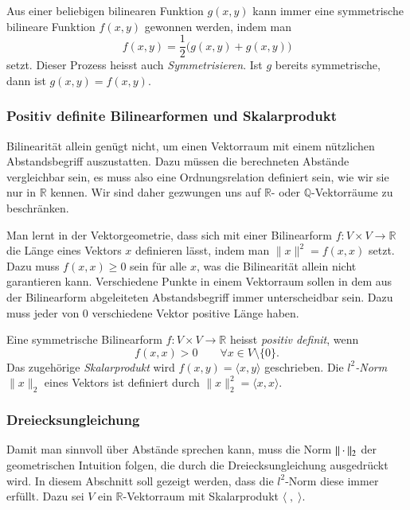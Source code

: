 Aus einer beliebigen bilinearen Funktion $g(x,y)$ kann immer eine
symmetrische bilineare Funktion $f(x,y)$ gewonnen werden, indem
man 
\[
f(x,y) = \frac12 \bigl(g(x,y)+g(x,y)\bigr)
\]
setzt.
Dieser Prozess heisst auch {\em Symmetrisieren}.
%
Ist $g$ bereits symmetrische, dann ist $g(x,y)=f(x,y)$.

\subsubsection{Positiv definite Bilinearformen und Skalarprodukt}
Bilinearität allein genügt nicht, um einen Vektorraum mit einem
nützlichen Abstandsbegriff auszustatten.
Dazu müssen die berechneten Abstände vergleichbar sein, es muss also
eine Ordnungsrelation definiert sein, wie wir sie nur in $\mathbb{R}$
kennen.
Wir sind daher gezwungen uns auf $\mathbb{R}$- oder
$\mathbb{Q}$-Vektorräume zu beschränken.

Man lernt in der Vektorgeometrie, dass sich mit einer Bilinearform
$f\colon V\times V\to\mathbb{R}$ 
die Länge eines Vektors $x$ definieren lässt, indem man $\|x\|^2 = f(x,x)$
setzt.
Dazu muss $f(x,x)\ge 0$ sein für alle $x$, was die Bilinearität
allein nicht garantieren kann.
Verschiedene Punkte in einem Vektorraum sollen in dem aus der Bilinearform
abgeleiteten Abstandsbegriff immer unterscheidbar sein.
Dazu muss jeder von $0$ verschiedene Vektor positive Länge haben.

\begin{definition}
Eine symmetrische Bilinearform $f\colon V\times V\to\mathbb{R}$
heisst {\em positiv definit}, wenn
%
\[
f(x,x) > 0\qquad\forall x\in V\setminus\{0\}.
\]
Das zugehörige {\em Skalarprodukt} wird $f(x,y)=\langle x,y\rangle$
geschrieben.
%
Die {\em $l^2$-Norm} $\|x\|_2$ eines Vektors ist definiert durch
$\|x\|_2^2 = \langle x,x\rangle$.
%
\end{definition}

\subsubsection{Dreiecksungleichung}
Damit man sinnvoll über Abstände sprechen kann, muss die Norm
$\|\mathstrut\cdot\mathstrut\|_2$
der geometrischen Intuition folgen, die durch
die Dreiecksungleichung ausgedrückt wird.
In diesem Abschnitt soll gezeigt werden, dass die $l^2$-Norm
diese immer erfüllt.
Dazu sei $V$ ein $\mathbb{R}$-Vektorraum mit Skalarprodukt
$\langle\;,\;\rangle$.

